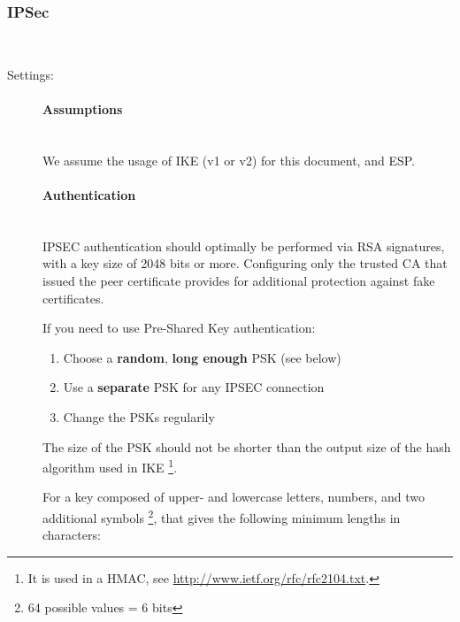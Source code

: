 \subsubsection{IPSec}
\label{section:IPSECgeneral}


 \\

\begin{description}

\item[Settings:] \mbox{}

\paragraph*{Assumptions}\mbox{}\\

We assume the usage of IKE (v1 or v2) for this document, and ESP.

\paragraph*{Authentication}\mbox{}\\

IPSEC authentication should optimally be performed via RSA signatures,
with a key size of 2048 bits or more. Configuring only the trusted CA
that issued the peer certificate provides for additional protection
against fake certificates.

If you need to use Pre-Shared Key authentication:

\begin{enumerate}
\item Choose a \textbf{random}, \textbf{long enough} PSK (see below)
\item Use a \textbf{separate} PSK for any IPSEC connection
\item Change the PSKs regularily
\end{enumerate}

The size of the PSK should not be shorter than the output size of
the hash algorithm used in IKE \footnote{It is used in a HMAC, see
  \url{http://www.ietf.org/rfc/rfc2104.txt}.}.

For a key composed of upper- and lowercase letters, numbers, and two
additional symbols \footnote{64 possible values = 6 bits}, that gives
the following minimum lengths in characters:


\end{description}
